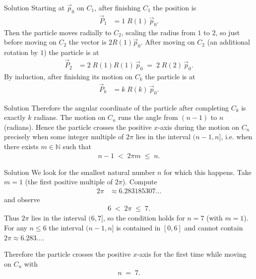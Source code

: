 \documentclass{beamer}
\begin{document}
\begin{frame}{Solution}
Starting at $\vec{p}_0$ on $C_1$, after finishing $C_1$ the position is
\begin{align}
    \vec{P}_1 &= 1\;R(1)\,\vec{p}_0.
\end{align}
Then the particle moves radially to $C_2$, scaling the radius from $1$ to $2$, so just before moving on $C_2$ the vector is $2R(1)\vec{p}_0$. After moving on $C_2$ (an additional rotation by $1$) the particle is at
\begin{align}
    \vec{P}_2 &= 2\;R(1)R(1)\,\vec{p}_0 \;=\; 2\;R(2)\,\vec{p}_0.
\end{align}
By induction, after finishing its motion on $C_k$ the particle is at
\begin{align}
    \vec{P}_k &= k\;R(k)\,\vec{p}_0.
\end{align}
\end{frame}

\begin{frame}{Solution}
Therefore the angular coordinate of the particle after completing $C_k$ is exactly $k$ radians.
The motion on $C_n$ runs the angle from $(n-1)$ to $n$ (radians).  
Hence the particle crosses the positive $x$-axis during the motion on $C_n$ precisely when some integer multiple of $2\pi$ lies in the interval $(n-1,n]$, i.e. when there exists $m\in\mathbb{N}$ such that
\begin{align}
    n-1 \;<\; 2\pi m \;\le\; n .
\end{align}
\end{frame}

\begin{frame}{Solution}
We look for the smallest natural number $n$ for which this happens.  
Take $m=1$ (the first positive multiple of $2\pi$). Compute
\begin{align}
    2\pi &\approx 6.283185307\ldots
\end{align}
and observe
\begin{align}
    6 \;<\; 2\pi \;\le\; 7.
\end{align}
Thus $2\pi$ lies in the interval $(6,7]$, so the condition holds for $n=7$ (with $m=1$).  
For any $n\le 6$ the interval $(n-1,n]$ is contained in $[0,6]$ and cannot contain $2\pi\approx 6.283\ldots$.

Therefore the particle crosses the positive $x$-axis for the first time while moving on $C_n$ with
\begin{align}
    \boxed{n \;=\; 7.}
\end{align}
\end{frame}
\end{document}
